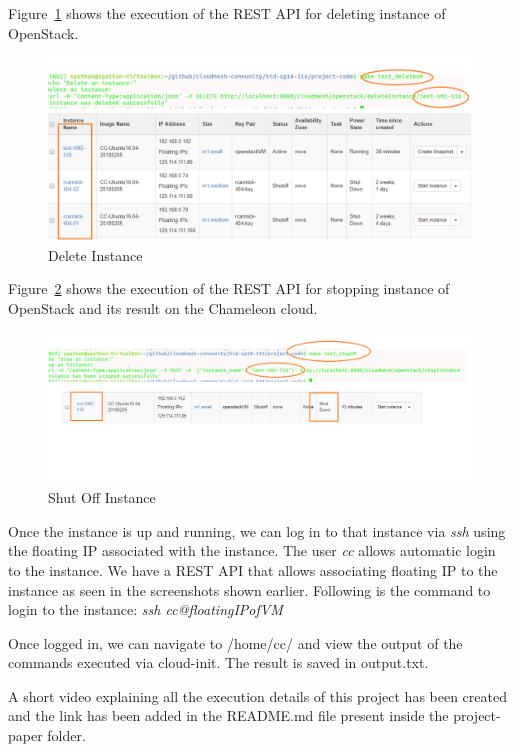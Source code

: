 Figure~\ref{fig:deleteVM} shows the execution of the REST API for deleting
instance of OpenStack.
\begin{figure}[!ht]
        \centering\includegraphics[width=\columnwidth]{images/deleteVM.png}
        \caption{Delete Instance}\label{fig:deleteVM}
\end{figure}

Figure~\ref{fig:stopVM} shows the execution of the REST API for stopping
instance of OpenStack and its result on the Chameleon cloud.

\begin{figure}[!ht]
        \centering\includegraphics[width=\columnwidth]{images/stopVM.png}
        \caption{Shut Off Instance}\label{fig:stopVM}
\end{figure}

Once the instance is up and running, we can log in to that instance via
\textit{ssh} using the floating IP associated with the instance. The user
\textit{cc} allows automatic login to the instance. We have a REST API that
allows associating floating IP to the instance as seen in the screenshots shown
earlier. Following is the command to login to the instance:
\textit{ssh cc@floatingIPofVM}

Once logged in, we can navigate to /home/cc/ and view the output of the 
commands executed via cloud-init. The result is saved in output.txt.

A short video explaining all the execution details of this project has been
created and the link has been added in the README.md file present inside the  
project-paper folder.

